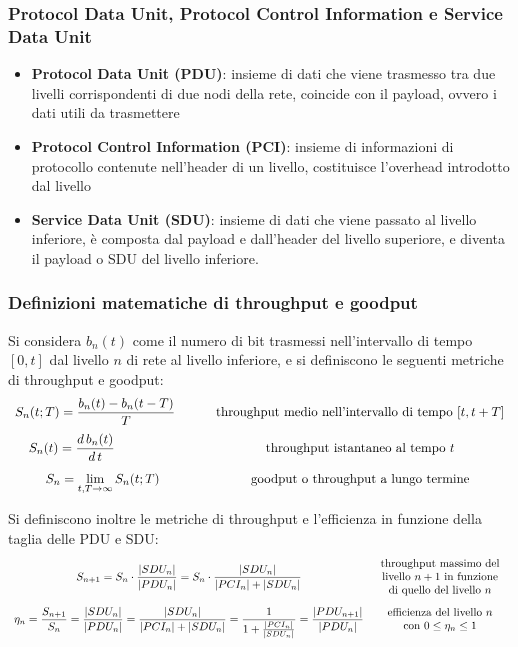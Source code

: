 \subsubsection*{Protocol Data Unit, Protocol Control Information e Service Data Unit}
\begin{itemize}
	\item \textbf{Protocol Data Unit (PDU)}: insieme di dati che viene trasmesso tra due livelli corrispondenti di due nodi
	della rete, coincide con il payload, ovvero i dati utili da trasmettere
	\item \textbf{Protocol Control Information (PCI)}: insieme di informazioni di protocollo contenute nell'header di un
	livello, costituisce l'overhead introdotto dal livello
	\item \textbf{Service Data Unit (SDU)}: insieme di dati che viene passato al livello inferiore, è composta dal payload
	e dall'header del livello superiore, e diventa il payload o SDU del livello inferiore.
\end{itemize}

\subsubsection*{Definizioni matematiche di throughput e goodput}
Si considera \(b_n(t)\) come il numero di bit trasmessi nell'intervallo di tempo \([0,t]\) dal livello \(n\) di rete
al livello inferiore, e si definiscono le seguenti metriche di throughput e goodput:
\[\begin{array}{c c}
	\displaystyle S_n(t;T) = \frac{b_n(t) - b_n(t-T)}{T} \quad\, & \quad \text{throughput medio nell'intervallo di tempo } [t,t+T] \\[10pt]
	\displaystyle S_n(t) = \frac{d \, b_n(t)}{d \, t} \qquad\qquad\;\, ~ & \quad \text{throughput istantaneo al tempo } t \\[12pt]
	\displaystyle S_n = \lim_{t,T \to \infty} S_n(t;T)  & \quad \text{goodput o throughput a lungo termine}
\end{array}\]

\noindent
Si definiscono inoltre le metriche di throughput e l'efficienza in funzione della taglia delle PDU e SDU:
\[\begin{array}{c c}
	\displaystyle S_{n+1} = S_n \cdot \frac{|SDU_n|}{|PDU_n|} = S_n \cdot \frac{|SDU_n|}{|PCI_n| + |SDU_n|} & \begin{array}{c} \text{throughput massimo del} \\ \text{livello } n+1 \text{ in funzione} \\ \text{di quello del livello } n \end{array} \\[20pt]
	\displaystyle \eta_n = \frac{S_{n+1}}{S_n} = \frac{|SDU_n|}{|PDU_n|} = \frac{|SDU_n|}{|PCI_n| + |SDU_n|} = \frac{1}{1 + \frac{|PCI_n|}{|SDU_n|}} = \frac{|PDU_{n+1}|}{|PDU_n|} & \begin{array}{c} \text{efficienza del livello } n \\ \text{con } 0 \leq \eta_n \leq 1 \end{array}
\end{array}\]

